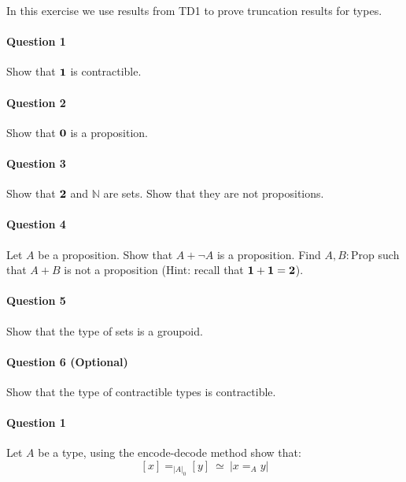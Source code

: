 \documentclass{article}[6pt]%
\newcommand{\one}{{\bf 1}}
\newcommand{\zero}{{\bf 0}}
\newcommand{\two}{{\bf 2}}
\newcommand{\Prop}{\mathrm{Prop}}
\begin{document}

\begin{Exercise}
In this exercise we use results from TD1 to prove truncation results for types.

\paragraph{Question 1} Show that $\one$ is contractible. %

\paragraph{Question 2} Show that $\zero$ is a proposition.

\paragraph{Question 3} Show that $\two$ and $\mathbb{N}$ are sets. Show that they are not propositions.

\paragraph{Question 4} Let $A$ be a proposition. Show that $A+ \lnot A$ is a proposition. Find $A,B:\Prop$ such that $A+B$ is not a proposition (Hint: recall that $\one+\one = \two$).

\paragraph{Question 5} Show that the type of sets is a groupoid.

\paragraph{Question 6 (Optional)} Show that the type of contractible types is contractible.

\end{Exercise}


\begin{Exercise}[title={Identity types in set-truncations}]
\paragraph{Question 1} Let $A$ be a type, using the encode-decode method show that: 
\[[x]=_{|A|_0}[y]\ \simeq \ |x=_A y|\]
\end{Exercise}
\end{document}
